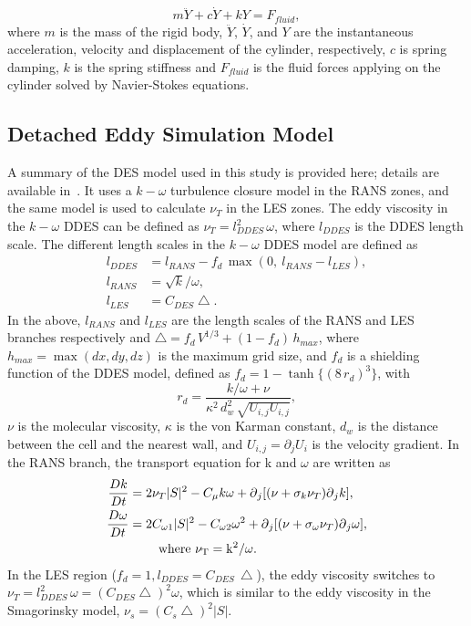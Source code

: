 \[ m\ddot{Y}+c\dot{Y}+kY=F_{fluid}, \] where $m$ is the mass of the rigid body,
$\ddot{Y}$, $\dot{Y}$, and $Y$ are the instantaneous acceleration, velocity and
displacement of the cylinder, respectively, $c$ is spring damping, $k$ is the
spring stiffness and $F_{fluid}$ is the fluid forces applying on the cylinder
solved by Navier-Stokes equations. 


\subsection{Detached Eddy Simulation Model}
\label{sec:DDES}
%
A summary of the DES model used in this study is provided here; details are
available in~\cite{yin2015dynamic}. It uses a $k-\omega$ turbulence closure
model in the RANS zones, and the same model is used to calculate $\nu_T$ in the
LES zones. The eddy viscosity in the $k-\omega$ DDES can be defined as
$\nu_T=l_{DDES}^2\, \omega$, where $l_{DDES}$ is the DDES length scale. The
different length scales in the $k-\omega$ DDES model are defined as
%
\begin{align*}  
  l_{DDES} &=l_{RANS}-f_d\, \max( 0,~l_{RANS}-l_{LES}), \\
  l_{RANS} &=\sqrt{k}/\omega,\\
  l_{LES} &=C_{DES}\bigtriangleup.
\end{align*}
%
In the above, $l_{RANS}$ and $l_{LES}$ are the length scales of the RANS and LES
branches respectively and $\bigtriangleup = f_d \,V^{1/3}+(1-f_d ) \,h_{max}$,
where $h_{max} = \max(dx,dy,dz)$ is the maximum grid size, and $f_d$ is a
shielding function of the DDES model, defined as $f_d = 1 -
\tanh\{(8\,r_d)^3\}$, with
\[
  r_d=\frac{k/\omega+\nu}{\kappa^2 \, d_w^2 \, \sqrt{U_{i,j} U_{i,j} }},
\]
$\nu$ is the molecular viscosity, $\kappa$ is the von Karman constant, $d_w$ is
the distance between the cell and the nearest wall, and $U_{i,j}=\partial_j
U_i$ is the velocity gradient.  In the RANS branch, the transport equation for
k and $\omega$ are written as
%
\begin{align*}  
  \frac{Dk}{Dt} & = 2\nu_T |S|^2-C_\mu k\omega+\partial{_j [(\nu+\sigma_k \nu_T ) \partial{_j k}]},\\
  \frac{D\omega}{Dt} & = 2C_{\omega1} |S|^2-C_{\omega2} \omega^2 
                    +\partial{_j [(\nu+\sigma_\omega \nu_T )\partial{_j \omega}]},\\
    &~~~~~~~\rm{where}~\nu_T=k^2/\omega.   
\end{align*}  
%
In the LES region ($f_d=1,l_{DDES}=C_{DES} \, \bigtriangleup$), the eddy viscosity
switches to $\nu_T=l_{DDES}^2\,\omega=(C_{DES}\bigtriangleup)^2\omega$, which is
similar to the eddy viscosity in the Smagorinsky model, $\nu_s=(C_s
\bigtriangleup)^2 |S|$.

